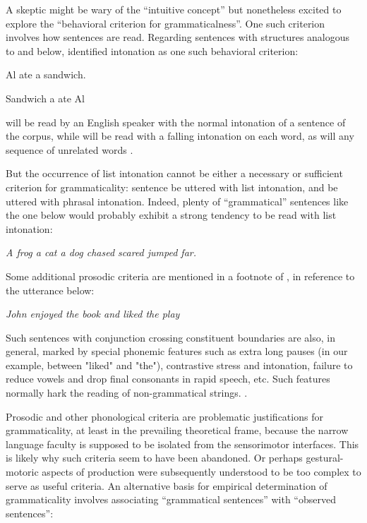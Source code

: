   A skeptic might be wary of the “intuitive concept” but nonetheless excited to explore the “behavioral criterion for grammaticalness”. One such criterion involves how sentences are read. Regarding sentences with structures analogous to  and  below, \citet{Chomsky1956} identified intonation as one such behavioral criterion:

\ea
Al ate a sandwich.
\z


\ea
Sandwich a ate Al
\z

 will be read by an English speaker with the normal intonation of a sentence of the corpus, while  will be read with a falling intonation on each word, as will any sequence of unrelated words \citep[114]{Chomsky1956}.

  But the occurrence of list intonation cannot be either a necessary or sufficient criterion for grammaticality: sentence  be uttered with list intonation, and  be uttered with phrasal intonation. Indeed, plenty of “grammatical” sentences like the one below would probably exhibit a strong tendency to be read with list intonation: 

\textit{A frog a cat a dog chased scared jumped far.}

Some additional prosodic criteria are mentioned in a footnote of \citet{Chomsky1957}, in reference to the utterance below:

\textit{John enjoyed the book and liked the play}

Such sentences with conjunction crossing constituent boundaries are also, in general, marked by special phonemic features such as extra long pauses (in our example, between "liked" and "the"), contrastive stress and intonation, failure to reduce vowels and drop final consonants in rapid speech, etc. Such features normally hark the reading of non-grammatical strings. \citep[35-36]{Chomsky1957}.

  Prosodic and other phonological criteria are problematic justifications for grammaticality, at least in the prevailing theoretical frame, because the narrow language faculty is supposed to be isolated from the sensorimotor interfaces. This is likely why such criteria seem to have been abandoned. Or perhaps gestural-motoric aspects of production were subsequently understood to be too complex to serve as useful criteria.   An alternative basis for empirical determination of grammaticality involves associating “grammatical sentences” with “observed sentences”:

